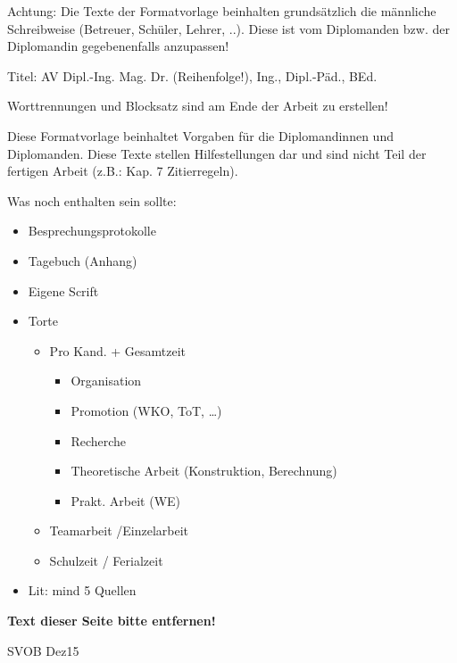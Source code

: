 
Achtung:
Die Texte der Formatvorlage beinhalten grundsätzlich die männliche Schreibweise (Betreuer, Schüler, Lehrer, ..). Diese ist vom Diplomanden bzw. der Diplomandin gegebenenfalls anzupassen!
\bigskip

Titel: AV Dipl.-Ing. Mag. Dr. (Reihenfolge!),   Ing.,   Dipl.-Päd., BEd.
\bigskip

Worttrennungen und Blocksatz sind am Ende der Arbeit zu erstellen!
\bigskip

Diese Formatvorlage beinhaltet Vorgaben für die Diplomandinnen  und Diplomanden. Diese Texte stellen Hilfestellungen dar und sind nicht Teil der fertigen Arbeit (z.B.: Kap. 7 Zitierregeln).
\bigskip


Was noch enthalten sein sollte:
\begin{itemize}
 \item Besprechungsprotokolle
 \item Tagebuch (Anhang)
 \item Eigene Scrift
 \item Torte
 \begin{itemize}
    \item Pro Kand. + Gesamtzeit
    \begin{itemize}
      \item Organisation
      \item Promotion (WKO, ToT, …)
      \item Recherche
      \item Theoretische Arbeit (Konstruktion, Berechnung)
      \item Prakt. Arbeit (WE)
    \end{itemize}
    \item Teamarbeit /Einzelarbeit
    \item Schulzeit / Ferialzeit
\end{itemize}
 \item Lit: mind 5 Quellen

\end{itemize}

\bigskip
\bigskip

\textbf{Text dieser Seite bitte entfernen!}

\bigskip

SVOB Dez15


